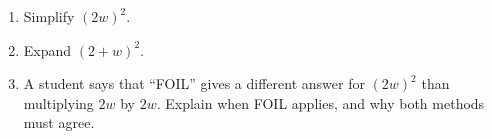 \begin{enumerate}
\item[(a)] Simplify $(2w)^2$.
\item[(b)] Expand $(2+w)^2$.
\item[(c)] A student says that ``FOIL'' gives a different answer for $(2w)^2$ than multiplying $2w$ by $2w$. Explain when FOIL applies, and why both methods must agree.
\end{enumerate}
